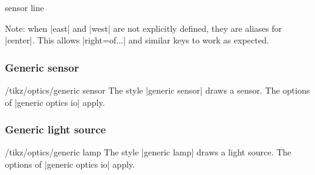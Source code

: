 \documentclass[a4paper]{ltxdoc}
\begin{document}
\begin{shape}{sensor line}
\begin{codeexample}[]
\end{codeexample}

\end{shape}


Note: when |east| and |west| are not explicitly defined, they are aliases for |center|. This allows |right=of...| and similar keys to work as expected.



\subsubsection{Generic sensor}

\begin{stylekey}{/tikz/optics/generic sensor}
The style |generic sensor| draws a sensor. 
The options of |generic optics io| apply.

\begin{codeexample}[width=6cm]
\end{codeexample}
\end{stylekey}

\subsubsection{Generic light source}

\begin{stylekey}{/tikz/optics/generic lamp}
The style |generic lamp| draws a light source.
The options of |generic optics io| apply.

\begin{codeexample}[width=6cm]
\end{codeexample}
\end{stylekey}
\end{document}
